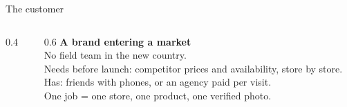 \begin{frame}{The customer}
  \begin{columns}[T]
    \begin{column}{0.4\textwidth}\centering
    \end{column}
    \begin{column}{0.6\textwidth}
      {\Large\bfseries A brand entering a market}\\[0.3em]
      No field team in the new country.\\[1em]
      \alert{Needs before launch:} competitor prices and availability, store by store.\\[0.4em]
      \alert{Has:} friends with phones, or an agency paid per visit.\\[0.8em]
      {\scriptsize One job = one store, one product, one verified photo.}
    \end{column}
  \end{columns}
\end{frame}

